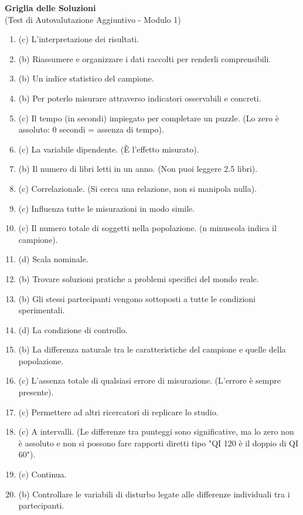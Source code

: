 \documentclass[12pt, a4paper]{article}
\begin{document}
\begin{enumerate}
\end{enumerate} %

\newpage %

\begin{center}
    \Large\textbf{Griglia delle Soluzioni} \\
    \vspace{0.5cm}
    \normalsize{(Test di Autovalutazione Aggiuntivo - Modulo 1)}
\end{center}
\vspace{1cm}

\begin{enumerate}[leftmargin=*, label=\arabic*.]
    \item (c) L'interpretazione dei risultati.
    \item (b) Riassumere e organizzare i dati raccolti per renderli comprensibili.
    \item (b) Un indice statistico del campione.
    \item (b) Per poterlo misurare attraverso indicatori osservabili e concreti.
    \item (c) Il tempo (in secondi) impiegato per completare un puzzle. (Lo zero è assoluto: 0 secondi = assenza di tempo).
    \item (c) La variabile dipendente. (È l'effetto misurato).
    \item (b) Il numero di libri letti in un anno. (Non puoi leggere 2.5 libri).
    \item (c) Correlazionale. (Si cerca una relazione, non si manipola nulla).
    \item (c) Influenza tutte le misurazioni in modo simile.
    \item (c) Il numero totale di soggetti nella popolazione. (n minuscola indica il campione).
    \item (d) Scala nominale.
    \item (b) Trovare soluzioni pratiche a problemi specifici del mondo reale.
    \item (b) Gli stessi partecipanti vengono sottoposti a tutte le condizioni sperimentali.
    \item (d) La condizione di controllo.
    \item (b) La differenza naturale tra le caratteristiche del campione e quelle della popolazione.
    \item (c) L'assenza totale di qualsiasi errore di misurazione. (L'errore è sempre presente).
    \item (c) Permettere ad altri ricercatori di replicare lo studio.
    \item (c) A intervalli. (Le differenze tra punteggi sono significative, ma lo zero non è assoluto e non si possono fare rapporti diretti tipo "QI 120 è il doppio di QI 60").
    \item (c) Continua.
    \item (b) Controllare le variabili di disturbo legate alle differenze individuali tra i partecipanti.
\end{enumerate}
\end{document}

